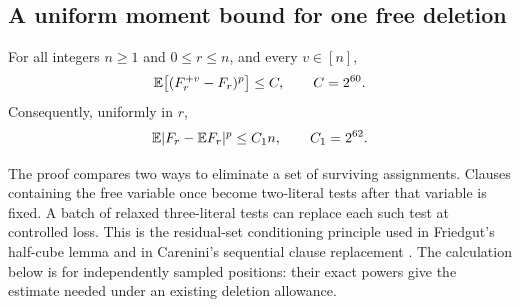 \subsection{A uniform moment bound for one free deletion}

\begin{lemma}\label{cp:deletion-moment}
For all integers $n\ge1$ and $0\le r\le n$, and every $v\in[n]$,
\begin{equation}\label{cp:one-delay}
 \mathbb E\bigl[(F_r^{+v}-F_r)^p\bigr]\le C,\qquad C=2^{60}.
\end{equation}
Consequently, uniformly in $r$,
\begin{equation}\label{cp:concentration}
 \mathbb E\lvert F_r-\mathbb E F_r\rvert^p\le C_1n,
 \qquad C_1=2^{62}.
\end{equation}
\end{lemma}

The proof compares two ways to eliminate a set of surviving assignments.
Clauses containing the free variable once become two-literal tests after
that variable is fixed. A batch of relaxed three-literal tests can replace
each such test at controlled loss. This is the residual-set conditioning
principle used in Friedgut's half-cube lemma
\cite[Lemma~5.7]{Friedgut1999} and in Carenini's sequential clause
replacement \cite[Theorem~4.3 and Lemma~6.1]{Carenini}. The calculation
below is for independently sampled positions: their exact powers give
the estimate needed under an existing deletion allowance.

